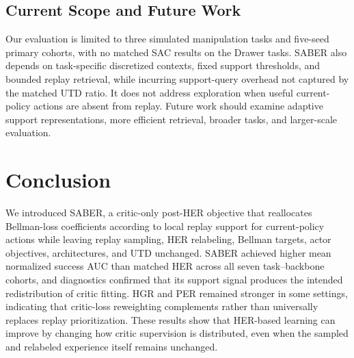 \documentclass[letterpaper]{article}
\begin{document}
\subsection{Current Scope and Future Work}

Our evaluation is limited to three simulated manipulation tasks and five-seed primary cohorts, with no matched SAC results on the Drawer tasks. SABER also depends on task-specific discretized contexts, fixed support thresholds, and bounded replay retrieval, while incurring support-query overhead not captured by the matched UTD ratio. It does not address exploration when useful current-policy actions are absent from replay. Future work should examine adaptive support representations, more efficient retrieval, broader tasks, and larger-scale evaluation.

\section{Conclusion}

We introduced SABER, a critic-only post-HER objective that reallocates Bellman-loss coefficients according to local replay support for current-policy actions while leaving replay sampling, HER relabeling, Bellman targets, actor objectives, architectures, and UTD unchanged. SABER achieved higher mean normalized success AUC than matched HER across all seven task--backbone cohorts, and diagnostics confirmed that its support signal produces the intended redistribution of critic fitting. HGR and PER remained stronger in some settings, indicating that critic-loss reweighting complements rather than universally replaces replay prioritization. These results show that HER-based learning can improve by changing how critic supervision is distributed, even when the sampled and relabeled experience itself remains unchanged.


\end{document}
